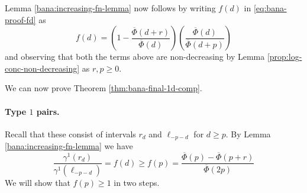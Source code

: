 Lemma \ref{bana:increasing-fn-lemma} now follows by writing $f(d)$ in \eqref{eq:bana-proof-fd} as 
\[f(d) = \left( 1 - \frac{\overline{\Phi}(d+r)}{\overline{\Phi}(d)}\right)\left(\frac{\overline{\Phi}(d)}{\overline{\Phi}(d+p)} \right) \]
and observing that both the terms above are non-decreasing by Lemma \ref{prop:log-conc-non-decreasing} as $r,p\geq 0$.

We can now prove Theorem \ref{thm:bana-final-1d-comp}. 




\paragraph{Type $1$ pairs.} 
Recall that these consist of intervals
$r_d$ and $\ell_{-p-d}$ for $d\geq p$.
By Lemma \ref{bana:increasing-fn-lemma}  we have 
\begin{equation}
    \frac{\gamma^1(r_{d}) }{\gamma^1(\ell_{-p-d})} = f(d) \geq f(p) =  \frac{\overline{\Phi}(p)-\overline{\Phi}(p+r)}{\overline{\Phi}(2p)}
    \label{bana:eq-final-comp-pair-1}
\end{equation}
We will show that $f(p) \geq 1$ in two steps.

